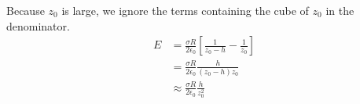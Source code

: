 \documentclass[../homework.tex]{subfiles}
\begin{document}
Because $z_0$ is large, we ignore the terms containing the cube of $z_0$ in the denominator. 
\begin{align*}
    E & = \frac{\sigma R}{2\epsilon_0} \left[
        \frac{1}{z_0 - h} - \frac{1}{z_0}
    \right] \\[10pt]
      & = \frac{\sigma R}{2\epsilon_0} \frac{h}{(z_0 - h) z_0} \\[10pt]
      & \approx \frac{\sigma R}{2\epsilon_0} \frac{h}{z_0^2}
\end{align*}
\end{document}

